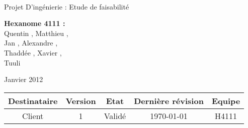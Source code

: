 \documentclass[a4paper]{article}
\begin{document}
\begin{titlepage}
~ 
\vfill
	\begin{center}
		\begin{Huge}
		Projet D'ingénierie : Etude de faisabilité\\
		\end{Huge} 
\vfill
		\textbf{Hexanome 4111 :} 
		\\Quentin {}, Matthieu , 
		\\Jan {}, Alexandre , 
		\\Thaddée , Xavier ,
		\\Tuuli {}
\vfill		
		\begin{Large}
		Janvier 2012
		\end{Large}
\vfill
	\begin{tabular}{|c|c|c|c|c|}
 	 \hline
   Destinataire & Version & Etat & Dernière révision & Equipe \\
   \hline
   Client & 1 & Validé & \today & H4111 \\
   \hline
	\end{tabular}
	\end{center}
\vfill
\end{titlepage}
\newpage
\tableofcontents
\newpage


\end{document}
